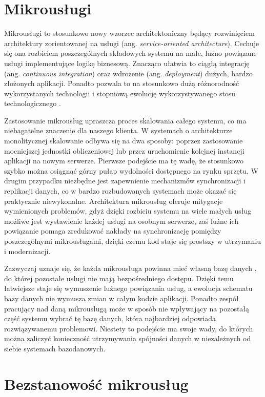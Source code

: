 \documentclass[licencjacka]{pracamgr}
\begin{document}
\section{Mikrousługi}

Mikrousługi to stosunkowo nowy wzorzec architektoniczny będący rozwinięciem
architektury zorientowanej na usługi (ang. \textit{service-oriented architecture}).
Cechuje się ona rozbiciem poszczególnych składowych systemu na małe, luźno powiązane
usługi implementujące logikę biznesową. Znacząco ułatwia to ciągłą integrację (ang.
\textit{continuous integration}) oraz wdrożenie (ang. \textit{deployment}) dużych,
bardzo złożonych aplikacji. Ponadto pozwala to na stosunkowo dużą różnorodność
wykorzystanych technologii i stopniową ewolucję wykorzystywanego stosu technologicznego
\cite{microsvc}.

Zastosowanie mikrousług upraszcza proces skalowania całego systemu, co ma niebagatelne
znaczenie dla naszego klienta. W systemach o architekturze monolitycznej skalowanie
odbywa się na dwa sposoby: poprzez zastosowanie mocniejszej jednostki obliczeniowej
lub przez uruchomienie kolejnej instancji aplikacji na nowym serwerze. Pierwsze
podejście ma tę wadę, że stosunkowo szybko można osiągnąć górny pułap wydolności
dostępnego na rynku sprzętu. W drugim przypadku niezbędne jest zapewnienie mechanizmów
synchronizacji i replikacji danych, co w bardzo rozbudowanych systemach może okazać się
praktycznie niewykonalne. Architektura mikrousług oferuje mitygacje wymienionych problemów,
gdyż dzięki rozbiciu systemu na wiele małych usług możliwe jest
wystawienie każdej usługi na osobnym serwerze, zaś luźne ich powiązanie pomaga
zredukować nakłady na synchronizację pomiędzy poszczególnymi mikrousługami, dzięki
czemu kod staje się prostszy w utrzymaniu i modernizacji.

Zazwyczaj uznaje się, że każda mikrousługa powinna mieć własną bazę danych \cite{nginx},
do której pozostałe usługi nie mają bezpośredniego dostępu. Dzięki temu łatwiejsze
staje się wymuszenie luźnego powiązania usług, a ewolucja schematu bazy danych nie
wymusza zmian w całym kodzie aplikacji. Ponadto zespół pracujący nad daną mikrousługą
może w sposób nie wpływający na pozostałą część systemu wybrać tę bazę danych, która
najbardziej odpowiada rozwiązywanemu problemowi. Niestety to podejście ma swoje wady,
do których można zaliczyć konieczność utrzymywania spójności danych w niezależnych
od siebie systemach bazodanowych.

\section{Bezstanowość mikrousług}
\end{document}
